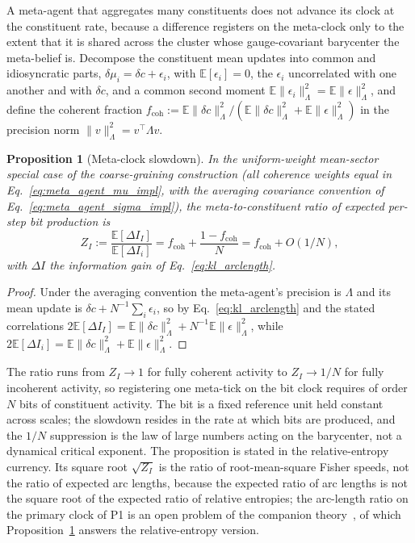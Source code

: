 \documentclass[11pt]{article}
\newtheorem{proposition}{Proposition}
\begin{document}
A meta-agent that aggregates many constituents does not advance its clock at the constituent rate, because a difference registers on the meta-clock only to the extent that it is shared across the cluster whose gauge-covariant barycenter the meta-belief is. Decompose the constituent mean updates into common and idiosyncratic parts, $\delta\mu_i = \delta c + \epsilon_i$, with $\mathbb{E}[\epsilon_i] = 0$, the $\epsilon_i$ uncorrelated with one another and with $\delta c$, and a common second moment $\mathbb{E}\|\epsilon_i\|^2_\Lambda = \mathbb{E}\|\epsilon\|^2_\Lambda$, and define the coherent fraction $f_{\mathrm{coh}} := \mathbb{E}\|\delta c\|^2_\Lambda / (\mathbb{E}\|\delta c\|^2_\Lambda + \mathbb{E}\|\epsilon\|^2_\Lambda)$ in the precision norm $\|v\|^2_\Lambda = v^\top \Lambda v$.
\begin{proposition}[Meta-clock slowdown]\label{prop:meta_clock_slowdown}
In the uniform-weight mean-sector special case of the coarse-graining construction (all coherence weights equal in Eq.~\eqref{eq:meta_agent_mu_impl}, with the averaging covariance convention of Eq.~\eqref{eq:meta_agent_sigma_impl}), the meta-to-constituent ratio of expected per-step bit production is
\begin{equation}
Z_I := \frac{\mathbb{E}[\Delta I_I]}{\mathbb{E}[\Delta I_i]} = f_{\mathrm{coh}} + \frac{1 - f_{\mathrm{coh}}}{N} = f_{\mathrm{coh}} + O(1/N),
\label{eq:bit_production_ratio}
\end{equation}
with $\Delta I$ the information gain of Eq.~\eqref{eq:kl_arclength}.
\end{proposition}
\begin{proof}
Under the averaging convention the meta-agent's precision is $\Lambda$ and its mean update is $\delta c + N^{-1}\sum_i \epsilon_i$, so by Eq.~\eqref{eq:kl_arclength} and the stated correlations $2\mathbb{E}[\Delta I_I] = \mathbb{E}\|\delta c\|^2_\Lambda + N^{-1}\mathbb{E}\|\epsilon\|^2_\Lambda$, while $2\mathbb{E}[\Delta I_i] = \mathbb{E}\|\delta c\|^2_\Lambda + \mathbb{E}\|\epsilon\|^2_\Lambda$.
\end{proof}
The ratio runs from $Z_I \to 1$ for fully coherent activity to $Z_I \to 1/N$ for fully incoherent activity, so registering one meta-tick on the bit clock requires of order $N$ bits of constituent activity. The bit is a fixed reference unit held constant across scales; the slowdown resides in the rate at which bits are produced, and the $1/N$ suppression is the law of large numbers acting on the barycenter, not a dynamical critical exponent. The proposition is stated in the relative-entropy currency. Its square root $\sqrt{Z_I}$ is the ratio of root-mean-square Fisher speeds, not the ratio of expected arc lengths, because the expected ratio of arc lengths is not the square root of the expected ratio of relative entropies; the arc-length ratio on the primary clock of P1 is an open problem of the companion theory~\cite[Ch.~7]{DennisGaugeVFE2026}, of which Proposition~\ref{prop:meta_clock_slowdown} answers the relative-entropy version.
\end{document}
